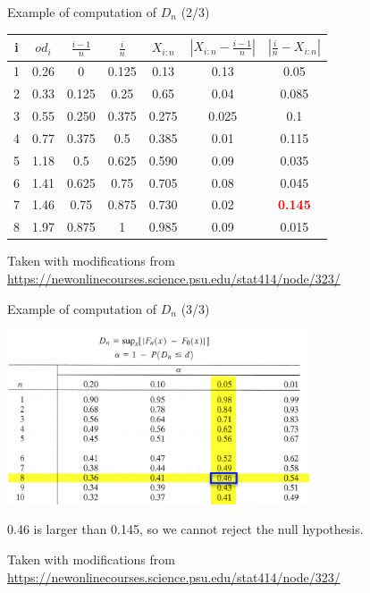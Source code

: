 \documentclass{beamer}
\begin{document}
\begin{frame}
{\centerline{Example of computation of $D_n$ (2/3)}}

\begin{center}
\begin{tabular}{|c|c|c|c|c|c|c|}
	\toprule
	i & $od_i$ & $\frac{i-1}{n}$ & $\frac{i}{n}$ & $X_{i:n}$ & $|X_{i:n} - \frac{i-1}{n} |$ & $|\frac{i}{n} - X_{i:n}|$\\
	\midrule
	1 & 0.26 & 0 & 0.125 & 0.13 & 0.13 & 0.05\\
	\midrule
	2 & 0.33 & 0.125 & 0.25 & 0.65 & 0.04 & 0.085\\
	\midrule
	3 & 0.55 & 0.250 & 0.375 & 0.275 & 0.025 & 0.1\\
	\midrule
	4 & 0.77 & 0.375 & 0.5 & 0.385 & 0.01 & 0.115\\
	\midrule
	5 & 1.18 & 0.5 & 0.625 & 0.590 & 0.09 & 0.035\\
	\midrule
	6 & 1.41 & 0.625 & 0.75 & 0.705 & 0.08 & 0.045\\
	\midrule
	7 & 1.46 & 0.75 & 0.875 & 0.730 & 0.02 & \textcolor{red}{\bf 0.145}\\
	\midrule
	8 & 1.97 & 0.875 & 1 & 0.985 & 0.09 & 0.015\\

	\bottomrule
\end{tabular}
\end{center}

\begin{center}
\tiny{Taken with modifications from \url{https://newonlinecourses.science.psu.edu/stat414/node/323/}}
\end{center}
\end{frame}

\begin{frame}
{\centerline{Example of computation of $D_n$ (3/3)}}

\begin{center}
\includegraphics[width=9cm]{P2023.AIBCCSS.InferenceAndLogisticRegression/TableKS.png}
\end{center}

0.46 is larger than 0.145, so we cannot reject the null hypothesis.

\begin{center}
\tiny{Taken with modifications from \url{https://newonlinecourses.science.psu.edu/stat414/node/323/}}
\end{center}
\end{frame}
\end{document}
